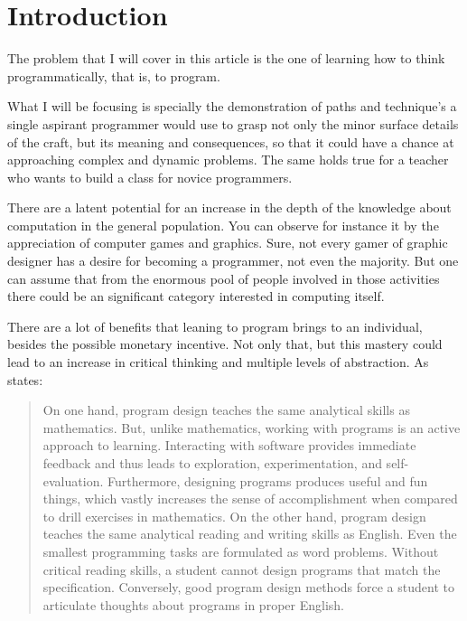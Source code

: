 \section{Introduction}
The problem that I will cover in this article is the one of learning how to
think programmatically, that is, to program.

What I will be focusing is specially the demonstration of paths and technique's
a single aspirant programmer would use to grasp not only the minor surface
details of the craft, but its meaning and consequences, so that it could have a
chance at approaching complex and dynamic problems. The same holds true for a
teacher who wants to build a class for novice programmers.

There are a latent potential for an increase in the depth of the knowledge about
computation in the general population. You can observe for instance it by the
appreciation of computer games and graphics. Sure, not every gamer of graphic
designer has a desire for becoming a programmer, not even the majority. But one
can assume that from the enormous pool of people involved in those activities
there could be an significant category interested in computing itself.

There are a lot of benefits that leaning to program brings to an individual,
besides the possible monetary incentive. \cite{education:sussman__why_programming_is_a_good_medium}
Not only that, but this mastery could lead to an increase in critical thinking
and multiple levels of abstraction. As \cite{education:felleisen__htdp} states:

\begin{quotation}
    On one hand, program design teaches the same analytical skills as mathematics.
    But, unlike mathematics, working with programs is an active approach to
    learning. Interacting with software provides immediate feedback and thus leads
    to exploration, experimentation, and self-evaluation. Furthermore, designing
    programs produces useful and fun things, which vastly increases the sense of
    accomplishment when compared to drill exercises in mathematics. On the other
    hand, program design teaches the same analytical reading and writing skills as
    English. Even the smallest programming tasks are formulated as word problems.
    Without critical reading skills, a student cannot design programs that match the
    specification. Conversely, good program design methods force a student to
    articulate thoughts about programs in proper English.
\end{quotation}

